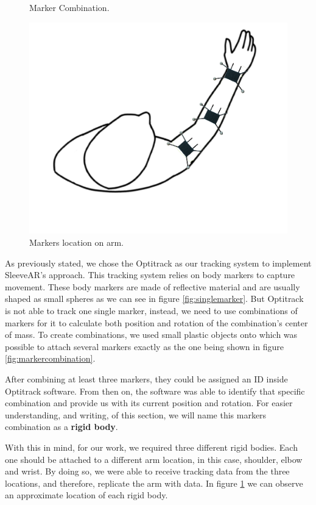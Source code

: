 \begin{figure}
    \caption{Marker Combination.}
    \label{fig:markercombination}
    \endminipage\hfill
{}
  \centering
  \includegraphics[width=\linewidth]{imgs/impl/rigidbodiesattached.png}
    \caption{Markers location on arm.}
    \label{fig:rigidbodiesattached}
    \endminipage
\end{figure}


As previously stated, we chose the Optitrack as our tracking system to implement SleeveAR's approach. This tracking system relies on body markers to capture movement.
These body markers are made of reflective material and are usually shaped as small spheres as we can see in figure \ref{fig:singlemarker}.
But Optitrack is not able to track one single marker, instead, we need to use combinations of markers for it to calculate both 
position and rotation of the combination's center of mass. 
To create combinations, we used small plastic objects onto which was possible to attach several markers exactly as the one being shown in figure \ref{fig:markercombination}.

After combining at least three markers, they could be assigned an ID inside Optitrack software. 
From then on, the software was able to identify that specific combination and provide us with its current position and rotation.
For easier understanding, and writing, of this section, we will name this markers combination as a \textbf{rigid body}.

With this in mind, for our work, we required three different rigid bodies. Each one should be attached to a different arm location, in this case, shoulder, elbow and wrist. 
By doing so, we were able to receive tracking data from the three locations, and therefore, replicate the arm with data. In figure \ref{fig:rigidbodiesattached} we can observe
an approximate location of each rigid body.


